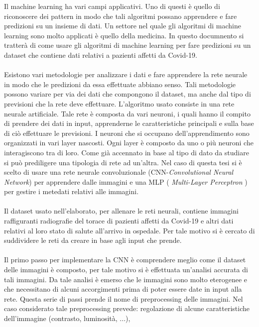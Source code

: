 Il machine learning ha vari campi applicativi.
Uno di questi è quello di riconoscere dei pattern in modo che tali algoritmi possano apprendere e fare predizioni su un insieme di dati.
Un settore nel quale gli algoritmi di machine learning sono molto applicati è quello della medicina.
In questo documnento si tratterà di come usare gli algoritmi di machine learning per fare predizioni su un dataset che contiene dati relativi a pazienti affetti da Covid-19.
\\\\
Esistono vari metodologie per analizzare i dati e fare apprendere la rete neurale in modo che le predizioni da essa effettuate abbiano senso.
Tali metodologie possono variare per via dei dati che compongono il dataset, ma anche dal tipo di previsioni che la rete deve effettuare.
L'algoritmo usato consiste in una rete neurale artificiale.
Tale rete è composta da vari neuroni, i quali hanno il compito di prendere dei dati in input, apprenderne le caratteristiche principali e sulla base di ciò effettuare le previsioni.
I neuroni che si occupano dell'apprendimento sono organizzati in vari layer nascosti. Ogni layer è composto da uno o più neuroni che interagiscono tra di loro. 
Come già accennato in base al tipo di dato da studiare si può prediligere una tipologia di rete ad un'altra.
Nel caso di questa tesi si è scelto di usare una rete neurale convoluzionale (CNN-\emph{Convolutional Neural Network}) per apprendere dalle immagini e una MLP ( \emph{Multi-Layer Perceptron} ) per gestire i metedati relativi alle immagini.
\\\\
Il dataset usato nell'elaborato, per allenare le reti neurali, contiene immagini raffiguranti radiografie del torace 
di pazienti affetti da Covid-19 e altri dati relativi al loro stato di salute all'arrivo in ospedale. Per tale motivo 
si è cercato di suddividere le reti da creare in base agli input che prende.
\\\\
Il primo passo per implementare la CNN è comprendere meglio come il dataset delle immagini è composto, per tale motivo 
si è effettuata un'analisi accurata di tali immagini.
Da tale analisi è emerso che le immagini sono molto eterogenee e che necessitano di alcuni accorgimenti prima di poter essere 
date in input alla rete. Questa serie di passi prende il nome di preprocessing delle immagini.
Nel caso considerato tale preprocessing prevede: regolazione di alcune caratteristiche dell'immagine (contrasto, luminosità, ...),
